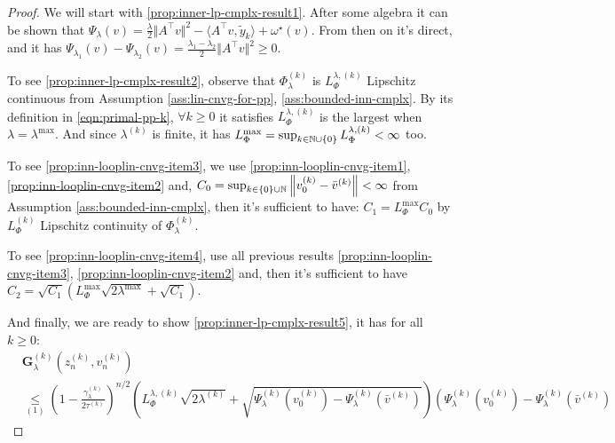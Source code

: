 \documentclass[12pt]{article}
\begin{document}
        \begin{proof}
            We will start with \ref{prop:inner-lp-cmplx-result1}. 
            After some algebra it can be shown that $\Psi_\lambda(v) = \frac{\lambda}{2}\Vert A^\top v\Vert^2 - \langle A^\top v, \tilde y_k\rangle + \omega^\star(v)$.
            From then on it's direct, and it has $\Psi_{\lambda_1}(v) - \Psi_{\lambda_2}(v) = \frac{\lambda_1 - \lambda_2}{2}\Vert A^\top v\Vert^2 \ge 0$. 
            \par
            To see \ref{prop:inner-lp-cmplx-result2}, observe that $\Phi_\lambda^{(k)}$ is $L_{\Phi}^{\lambda, (k)}$ Lipschitz continuous from Assumption \ref{ass:lin-cnvg-for-pp}, \ref{ass:bounded-inn-cmplx}. 
            By its definition in \eqref{eqn:primal-pp-k}, $\forall k \ge 0$ it satisfies $L_{\Phi}^{\lambda, (k)}$ is the largest when $\lambda = \lambda^{\max}$. 
            And since $\lambda^{(k)}$ is finite, it has $L^{\max}_\Phi = \sup_{k \in \mathbb N \cup \{0\}}L_{\Phi}^{\lambda, (k)} < \infty$ too. 
            \par
            To see \ref{prop:inn-looplin-cnvg-item3}, we use \ref{prop:inn-looplin-cnvg-item1}, \ref{prop:inn-looplin-cnvg-item2} and, $C_0 = \sup_{k \in \{0\}\cup \mathbb N} \left\Vert v_0^{(k)} - \bar v^{(k)} \right\Vert < \infty$ from Assumption \ref{ass:bounded-inn-cmplx}, then it's sufficient to have: $C_1 = L_{\Phi}^{\max} C_0$ by $L^{(k)}_\Phi$ Lipschitz continuity of $\Phi_\lambda^{(k)}$. 
            \par
            To see \ref{prop:inn-looplin-cnvg-item4}, use all previous results \ref{prop:inn-looplin-cnvg-item3}, \ref{prop:inn-looplin-cnvg-item2} and, then it's sufficient to have $C_2 = \sqrt{C_1}\left(L^{\max}_\Phi\sqrt{2\lambda^{\max}} + \sqrt{C_1}\right)$. 
            \par
            And finally, we are ready to show \ref{prop:inner-lp-cmplx-result5}, it has for all $k \ge 0$: 
            \begin{align*}
                & \mathbf G_\lambda^{(k)}(z_n^{(k)}, v_n^{(k)}) 
                \\
                &\underset{(1)}{\le} 
                \left(
                    1 - \frac{\gamma_\lambda^{(k)}}{2 \tau^{(k)}}
                \right)^{n/2}
                \left(
                    L_\Phi^{\lambda, (k)} \sqrt{2 \lambda^{(k)}} + 
                    \sqrt{\Psi_{\lambda}^{(k)}(v^{(k)}_0) - \Psi_\lambda^{(k)}(\bar v^{(k)})}
                \right)\left(
                    \Psi_{\lambda}^{(k)}(v^{(k)}_0) - \Psi_\lambda^{(k)}(\bar v^{(k)})

\end{align*}
\end{proof}
\end{document}
